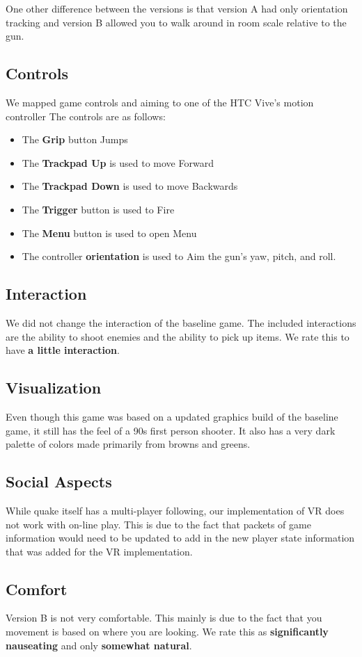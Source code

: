 \documentclass[journal]{IEEEtran}
\begin{document}
One other difference between the versions is that version A had only orientation tracking and version B allowed you to walk around in room scale relative to the gun.  

\subsection{Controls}
We mapped game controls and aiming to one of the HTC Vive's motion controller The controls are as follows: 

\begin{itemize}
	\item The \textbf{Grip} button Jumps 
	\item The \textbf{Trackpad Up} is used to move Forward 
	\item The \textbf{Trackpad Down} is used to move Backwards
	\item The \textbf{Trigger} button is used to Fire
	\item The \textbf{Menu} button is used to open Menu
	\item The controller \textbf{orientation} is used to Aim the gun's yaw, pitch, and roll.  
\end{itemize} 
\subsection{Interaction}
We did not change the interaction of the baseline game. The included interactions are the ability to shoot enemies and the ability to pick up items. We rate this to have \textbf{a little interaction}.

\subsection{Visualization}
Even though this game was based on a updated graphics build of the baseline game, it still has the feel of a 90s first person shooter. It also has a very dark palette of colors made primarily from browns and greens. 
\subsection{Social Aspects}
While quake itself has a multi-player following, our implementation of VR does not work with on-line play. This is due to the fact that packets of game information would need to be updated to add in the new player state information that was added for the VR implementation. 

\subsection{Comfort}
Version B is not very comfortable. This mainly is due to the fact that you movement is based on where you are looking. We rate this as \textbf{significantly nauseating} and only \textbf{somewhat natural}.
\end{document}
